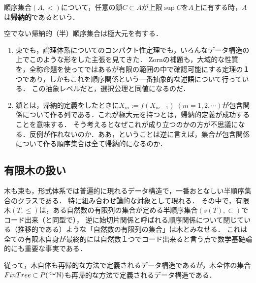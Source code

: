 \documentclass[uplatex, dvipdfmx]{jsreport}
\begin{document}
\begin{definition}
    順序集合$(A,<)$について，任意の鎖$C\subset A$が上限$\sup C$を$A$上に有する時，$A$は\textbf{帰納的}であるという．
\end{definition}
\begin{lemma}
    空でない帰納的（半）順序集合は極大元を有する．
\end{lemma}
\begin{remark}\mbox{}
    \begin{enumerate}
        \item 束でも，論理体系についてのコンパクト性定理でも，いろんなデータ構造の上でこのような形をした主張を見てきた．
        Zornの補題も，大域的な性質を，全称命題を使ってではあるが有限の範囲の中で確認可能にする定理の１つであり，しかもこれを順序関係という一番抽象的な述語について行っている．
        この抽象レベルだと，選択公理と同値になるのだ．
        \item 鎖とは，帰納的定義をしたときに$X_m:=f(X_{m-1})\;(m=1,2,\cdots)$が包含関係について作る列である．これが極大元を持つとは，帰納的定義が成功することを意味する．
        そう考えるとなぜこれが成り立つのかの方が不思議になる．反例が作れないのか．ああ，ということは逆に言えば，集合が包含関係について作る順序集合は全て帰納的になるのか．
    \end{enumerate}
\end{remark}

\subsection{有限木の扱い}

\begin{screen}
    木も束も，形式体系では普遍的に現れるデータ構造で，一番おとなしい半順序集合のクラスである．
    特に組み合わせ論的な対象として現れる．
    その中で，有限木$(T,\le)$は，ある自然数の有限列の集合が定める半順序集合$(s(T),\subset)$で
    コード出来（と同型で），
    逆に始切片関係と呼ばれる順序関係について閉じている（推移的である）ような「自然数の有限列の集合」は木とみなせる．
    これは全ての有限木自身が最終的には自然数１つでコード出来ると言う点で数学基礎論的にも重要な事実である．

    従って，木自体も再帰的な方法で定義されるデータ構造であるが，木全体の集合$FinTree\subset P({}^{<\omega}\mathbb{N})$も再帰的な方法で定義されるデータ構造である．
\end{screen}
\end{document}
